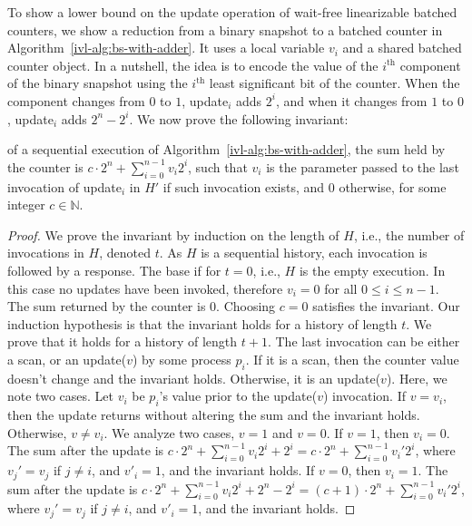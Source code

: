 To show a lower bound on the {\sc update} operation of wait-free linearizable batched counters,
we show a reduction from a binary snapshot to a batched counter in
Algorithm~\ref{ivl-alg:bs-with-adder}. It uses a local variable $v_i$ and a shared batched counter object.
In a nutshell, the idea is to encode the value of the $i^\text{th}$ component
of the binary snapshot using the $i^\text{th}$ least significant bit of the counter.
When the component changes from $0$ to $1$, {\sc update}$_i$ adds $2^i$, and when it changes from $1$ to $0$,
{\sc update}$_i$ adds $2^n - 2^i$. We now prove the following invariant:
\begin{invariant}
     of a sequential execution of Algorithm~\ref{ivl-alg:bs-with-adder},
    the sum held by the counter is $c \cdot 2^n + \sum_{i=0}^{n-1}v_i2^i$,
    such that $v_i$ is the parameter passed to the last invocation of {\sc update}$_i$ in $H'$ if such invocation
    exists, and $0$ otherwise, for some integer $c \in \mathbb{N}$.
    \label{ivl-inv:sum}
\end{invariant}
\begin{proof}
    We prove the invariant by induction on the length of $H$, i.e., the number of invocations in $H$,
    denoted $t$. As $H$ is a sequential history, each invocation is followed by a response.
    The base if for $t=0$, i.e., $H$ is the empty execution. In this case no updates
    have been invoked, therefore $v_i=0$ for all $0 \leq i \leq n-1$. The sum returned by the counter
    is $0$. Choosing $c=0$ satisfies the invariant.
    Our induction hypothesis is that the invariant holds for a history of length $t$.
    We prove that it holds for a history of length $t+1$. The last invocation can be either a {\sc scan}, or an {\sc update}($v$)
    by some process $p_i$. If it is a {\sc scan}, then the counter value doesn't change and the invariant
    holds. Otherwise, it is an {\sc update}($v$). Here, we note two cases. Let $v_i$ be $p_i$'s value
    prior to the {\sc update}($v$) invocation. If $v = v_i$, then the {\sc update} returns without altering the sum
    and the invariant holds. Otherwise, $v \neq v_i$. We analyze two cases, $v=1$ and $v=0$. If $v=1$, then $v_i=0$.
    The sum after the update is $c \cdot 2^n + \sum_{i=0}^{n-1}v_i2^i + 2^i=c \cdot 2^n + \sum_{i=0}^{n-1}v_i'2^i$, where
    $v_j'=v_j$ if $j \neq i$, and $v'_i = 1$, and the invariant holds. If $v=0$, then $v_i=1$.
    The sum after the update is $c \cdot 2^n + \sum_{i=0}^{n-1}v_i2^i + 2^n - 2^i = (c+1) \cdot 2^n + \sum_{i=0}^{n-1}v_i'2^i$,
    where $v_j'=v_j$ if $j \neq i$, and $v'_i = 1$, and the invariant holds.
\end{proof}

